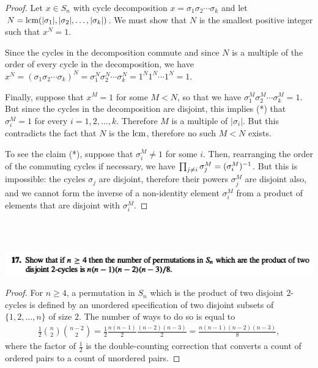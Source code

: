 \begin{proof}
  Let $x \in S_n$ with cycle decomposition $x = \sigma_1\sigma_2\cdots\sigma_k$ and
  let $N = \text{lcm}(|\sigma_1|, |\sigma_2|, \ldots, |\sigma_k|)$. We must show that $N$ is the smallest positive integer
  such that $x^N = 1$.

  Since the cycles in the decomposition commute and since $N$ is a multiple of the order of every
  cycle in the decomposition, we have $x^N = (\sigma_1\sigma_2\cdots\sigma_k)^N = \sigma_1^N\sigma_2^N\cdots\sigma_k^N = 1^N1^N\cdots1^N = 1$.

  Finally, suppose that $x^M = 1$ for some $M < N$, so that we have
  $\sigma_1^M\sigma_2^M\cdots\sigma_k^M = 1$. But since the cycles in the decomposition are disjoint, this implies (*)
  that $\sigma_i^M = 1$ for every $i = 1, 2, \ldots, k$. Therefore $M$ is a multiple of
  $|\sigma_i|$. But this contradicts the fact that $N$ is the $\text{lcm}$, therefore no such $M < N$ exists.

  To see the claim (*), suppose that $\sigma_i^M \neq 1$ for some $i$. Then, rearranging the order of the
  commuting cycles if necessary, we have $\prod_{j \neq i}\sigma_j^M = (\sigma_i^M)^{-1}$. But this is impossible: the
  cycles $\sigma_j$ are disjoint, therefore their powers $\sigma_j^M$ are disjoint also, and we cannot form
  the inverse of a non-identity element $\sigma_i^M$ from a product of elements that are disjoint
  with $\sigma_i^M$.
\end{proof}



~\\~\\
\begin{mdframed}
\includegraphics[width=400pt]{img/algebra--nf--2-b38d.png}
\end{mdframed}

\begin{proof}
  For $n \geq 4$, a permutation in $S_n$ which is the product of two disjoint $2$-cycles is defined by
  an unordered specification of two disjoint subsets of $\{1, 2, \ldots, n\}$ of size $2$. The number of
  ways to do so is equal to
  \begin{align*}
    \frac{1}{2}{n \choose 2}{n - 2 \choose 2} = \frac{1}{2}\frac{n(n-1)}{2}\frac{(n-2)(n-3)}{2} = \frac{n(n-1)(n-2)(n-3)}{8},
  \end{align*}
  where the factor of $\frac{1}{2}$ is the double-counting correction that converts a count of
  ordered pairs to a count of unordered pairs.
\end{proof}




